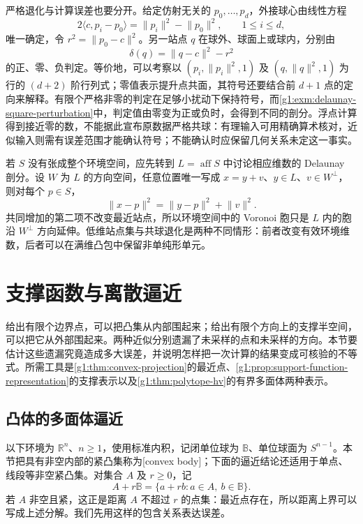 \ProseParagraphBreak

严格退化与计算误差也要分开。给定仿射无关的 \(p_0,\ldots,p_d\)，外接球心由线性方程
\[
	2\langle c,p_i-p_0\rangle=\lVert p_i\rVert^2-\lVert p_0\rVert^2,
	\qquad 1\le i\le d,
\]
唯一确定，令 \(r^2=\lVert p_0-c\rVert^2\)。另一站点 \(q\) 在球外、球面上或球内，分别由
\[
	\delta(q)=\lVert q-c\rVert^2-r^2
\]
的正、零、负判定。等价地，可以考察以 \((p_i,\lVert p_i\rVert^2,1)\) 及 \((q,\lVert q\rVert^2,1)\) 为行的 \((d+2)\) 阶行列式；零值表示提升点共面，其符号还要结合前 \(d+1\) 点的定向来解释。有限个严格非零的判定在足够小扰动下保持符号，而\cref{g1:exm:delaunay-square-perturbation}中，判定值由零变为正或负时，会得到不同的剖分。浮点计算得到接近零的数，不能据此宣布原数据严格共球：有理输入可用精确算术核对，近似输入则需有误差范围才能确认符号；不能确认时应保留几何关系未定这一事实。

\ProseParagraphBreak

若 \(S\) 没有张成整个环境空间，应先转到 \(L=\operatorname{aff}S\) 中讨论相应维数的 Delaunay 剖分。设 \(W\) 为 \(L\) 的方向空间，任意位置唯一写成 \(x=y+v\)、\(y\in L\)、\(v\in W^\perp\)，则对每个 \(p\in S\)，
\[
	\lVert x-p\rVert^2=\lVert y-p\rVert^2+\lVert v\rVert^2.
\]
共同增加的第二项不改变最近站点，所以环境空间中的 Voronoi 胞只是 \(L\) 内的胞沿 \(W^\perp\) 方向延伸。低维站点集与共球退化是两种不同情形：前者改变有效环境维数，后者可以在满维凸包中保留非单纯形单元。

\section{支撑函数与离散逼近}
\label{g1:sec:B03}

给出有限个边界点，可以把凸集从内部围起来；给出有限个方向上的支撑半空间，可以把它从外部围起来。两种近似分别遗漏了未采样的点和未采样的方向。本节要估计这些遗漏究竟造成多大误差，并说明怎样把一次计算的结果变成可核验的不等式。所需工具是\cref{g1:thm:convex-projection}的最近点、\cref{g1:prop:support-function-representation}的支撑表示以及\cref{g1:thm:polytope-hv}的有界多面体两种表示。

\subsection{凸体的多面体逼近}
\label{g1:subsec:B03:01}

以下环境为 \(\mathbb R^n\)、\(n\ge1\)，使用标准内积，记闭单位球为 \(\mathbb B\)、单位球面为 \(S^{n-1}\)。本节把具有非空内部的紧凸集称为[convex body]；下面的逼近结论还适用于单点、线段等非空紧凸集。对集合 \(A\) 及 \(r\ge0\)，记
\[
	A+r\mathbb B=\{a+rb:a\in A,\ b\in\mathbb B\}.
\]
若 \(A\) 非空且紧，这正是距离 \(A\) 不超过 \(r\) 的点集：最近点存在，所以距离上界可以写成上述分解。我们先用这样的包含关系表达误差。

